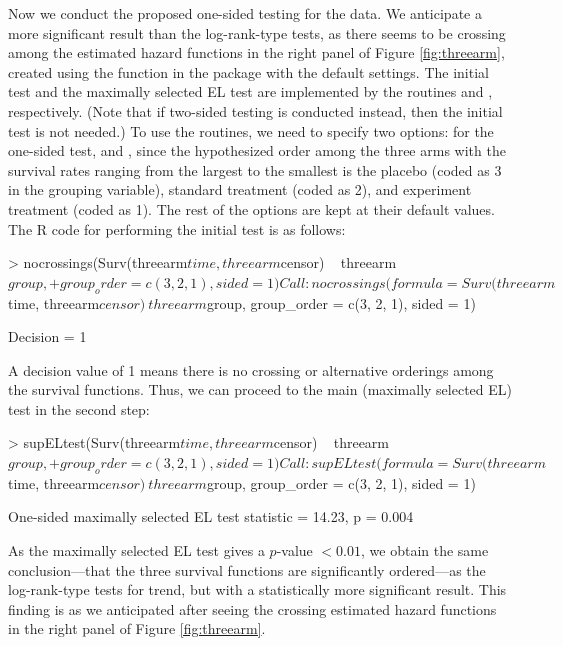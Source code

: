 Now we conduct the proposed one-sided testing for the  data. We anticipate a more significant result than the log-rank-type tests, as there seems to be crossing among the estimated hazard functions %
in the right panel of Figure \ref{fig:threearm}, created using the function  in the package  \cite[][]{muhaz:2019} with the default settings. %
The initial test and the maximally selected EL test are implemented by the routines  and , respectively. (Note that if two-sided testing is conducted instead, then the initial test is not needed.)
To use the routines, we need to specify two options:  for the one-sided test, and , since the hypothesized order among the three arms with the survival rates ranging from the largest to the smallest is the placebo (coded as 3 in the grouping variable), standard treatment (coded as 2), and experiment treatment (coded as 1). 
The rest of the options are kept at their default values. The R code for performing the initial test is as follows: \\
\begin{example}
>   nocrossings(Surv(threearm$time, threearm$censor) ~ threearm$group, 
+   group_order = c(3, 2, 1), sided = 1)

Call:
nocrossings(formula = Surv(threearm$time, threearm$censor) ~ threearm$group, 
group_order = c(3, 2, 1), sided = 1)

Decision = 1
\end{example}
A decision value of 1 means there is no crossing or alternative orderings among the survival functions. Thus, we can proceed to the main (maximally selected EL) test
in the second step: \\
\begin{example}
>   supELtest(Surv(threearm$time, threearm$censor) ~ threearm$group, 
+   group_order = c(3, 2, 1), sided = 1)

Call:
supELtest(formula = Surv(threearm$time, threearm$censor) ~ threearm$group,
group_order = c(3, 2, 1), sided = 1)

One-sided maximally selected EL test statistic = 14.23, p = 0.004
\end{example}
As the maximally selected EL test gives a $p$-value $<0.01$, we obtain the same conclusion---that the three survival functions are significantly ordered---as the log-rank-type tests for trend, but with a statistically more significant result. This finding is as we anticipated after seeing the crossing estimated hazard functions in the right panel of Figure \ref{fig:threearm}.


